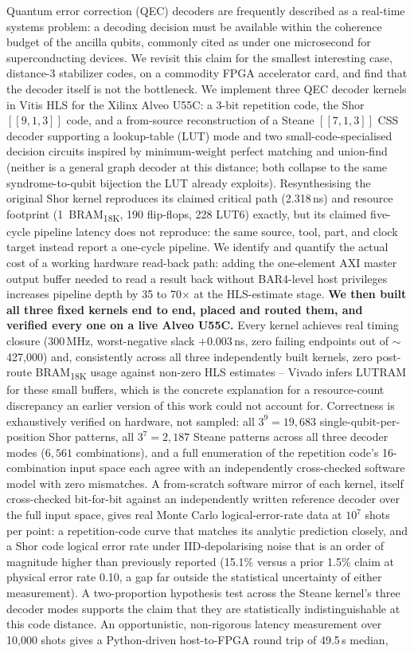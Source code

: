 Quantum error correction (QEC) decoders are frequently described as a real-time systems problem: a decoding decision must be available within the coherence budget of the ancilla qubits, commonly cited as under one microsecond for superconducting devices. We revisit this claim for the smallest interesting case, distance-3 stabilizer codes, on a commodity FPGA accelerator card, and find that the decoder itself is not the bottleneck. We implement three QEC decoder kernels in Vitis HLS for the Xilinx Alveo U55C: a 3-bit repetition code, the Shor \([[9,1,3]]\) code, and a from-source reconstruction of a Steane \([[7,1,3]]\) CSS decoder supporting a lookup-table (LUT) mode and two small-code-specialised decision circuits inspired by minimum-weight perfect matching and union-find (neither is a general graph decoder at this distance; both collapse to the same syndrome-to-qubit bijection the LUT already exploits). Resynthesising the original Shor kernel reproduces its claimed critical path (2.318\,ns) and resource footprint (1~BRAM\textsubscript{18K}, 190 flip-flops, 228 LUT6) exactly, but its claimed five-cycle pipeline latency does not reproduce: the same source, tool, part, and clock target instead report a one-cycle pipeline. We identify and quantify the actual cost of a working hardware read-back path: adding the one-element AXI master output buffer needed to read a result back without BAR4-level host privileges increases pipeline depth by 35 to 70\(\times\) at the HLS-estimate stage. \textbf{We then built all three fixed kernels end to end, placed and routed them, and verified every one on a live Alveo U55C.} Every kernel achieves real timing closure (300\,MHz, worst-negative slack $+0.003$\,ns, zero failing endpoints out of $\sim$427,000) and, consistently across all three independently built kernels, zero post-route BRAM\textsubscript{18K} usage against non-zero HLS estimates -- Vivado infers LUTRAM for these small buffers, which is the concrete explanation for a resource-count discrepancy an earlier version of this work could not account for. Correctness is exhaustively verified on hardware, not sampled: all $3^9=19{,}683$ single-qubit-per-position Shor patterns, all $3^7=2{,}187$ Steane patterns across all three decoder modes ($6{,}561$ combinations), and a full enumeration of the repetition code's 16-combination input space each agree with an independently cross-checked software model with zero mismatches. A from-scratch software mirror of each kernel, itself cross-checked bit-for-bit against an independently written reference decoder over the full input space, gives real Monte Carlo logical-error-rate data at \(10^7\) shots per point: a repetition-code curve that matches its analytic prediction closely, and a Shor code logical error rate under IID-depolarising noise that is an order of magnitude higher than previously reported (15.1\% versus a prior 1.5\% claim at physical error rate 0.10, a gap far outside the statistical uncertainty of either measurement). A two-proportion hypothesis test across the Steane kernel's three decoder modes supports the claim that they are statistically indistinguishable at this code distance. An opportunistic, non-rigorous latency measurement over 10,000 shots gives a Python-driven host-to-FPGA round trip of 49.5\,\textmu{}s median, 